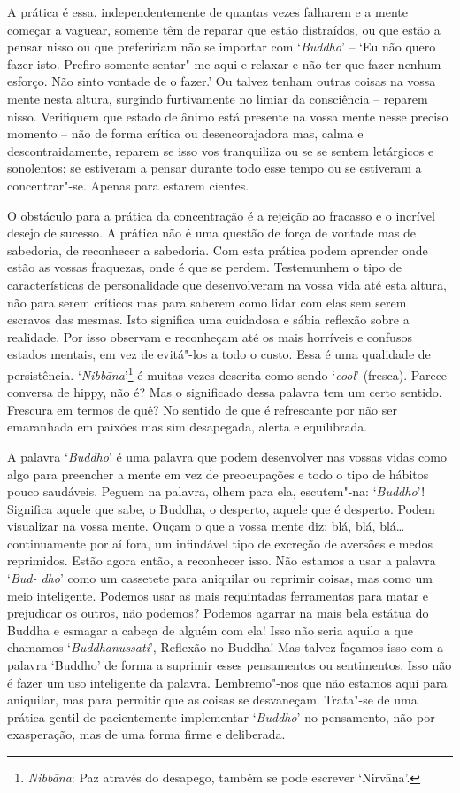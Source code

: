 A prática é essa, independentemente de quantas vezes falharem e a mente
começar a vaguear, somente têm de reparar que estão distraídos, ou que
estão a pensar nisso ou que prefeririam não se importar com
`\emph{Buddho}' -- `Eu não quero fazer isto. Prefiro somente sentar"-me
aqui e relaxar e não ter que fazer nenhum esforço. Não sinto vontade de
o fazer.' Ou talvez tenham outras coisas na vossa mente nesta altura,
surgindo furtivamente no limiar da consciência -- reparem nisso.
Verifiquem que estado de ânimo está presente na vossa mente nesse
preciso momento -- não de forma crítica ou desencorajadora mas, calma e
descontraidamente, reparem se isso vos tranquiliza ou se se sentem
letárgicos e sonolentos; se estiveram a pensar durante todo esse tempo
ou se estiveram a concentrar"-se. Apenas para estarem cientes.

O obstáculo para a prática da concentração é a rejeição ao fracasso e o
incrível desejo de sucesso. A prática não é uma questão de força de
vontade mas de sabedoria, de reconhecer a sabedoria. Com esta prática
podem aprender onde estão as vossas fraquezas, onde é que se perdem.
Testemunhem o tipo de características de personalidade que desenvolveram
na vossa vida até esta altura, não para serem críticos mas para saberem
como lidar com elas sem serem escravos das mesmas. Isto significa
uma cuidadosa e sábia reflexão sobre a realidade. Por isso observam e
reconheçam até os mais horríveis e confusos estados mentais, em vez de
evitá"-los a todo o custo. Essa é uma qualidade de persistência.
`\emph{Nibbāna}'\footnote{%
  \emph{Nibbāna}: Paz através do desapego, também se pode escrever `Nirvāņa'.}
é muitas vezes descrita como sendo `\emph{cool}'
(fresca). Parece conversa de hippy, não é? Mas o significado dessa
palavra tem um certo sentido. Frescura em termos de quê? No sentido de
que é refrescante por não ser emaranhada em paixões mas sim desapegada,
alerta e equilibrada.

A palavra `\emph{Buddho}' é uma palavra que podem desenvolver nas vossas
vidas como algo para preencher a mente em vez de preocupações e todo o
tipo de hábitos pouco saudáveis. Peguem na palavra, olhem para ela,
escutem"-na: `\emph{Buddho}'! Significa aquele que sabe, o Buddha, o
desperto, aquele que é desperto. Podem visualizar na vossa mente. Ouçam
o que a vossa mente diz: blá, blá, blá\ldots{} continuamente por aí
fora, um infindável tipo de excreção de aversões e medos reprimidos.
Estão agora então, a reconhecer isso. Não estamos a usar a palavra
`\emph{Bud- dho}' como um cassetete para aniquilar ou reprimir coisas,
mas como um meio inteligente. Podemos usar as mais requintadas
ferramentas para matar e prejudicar os outros, não podemos? Podemos
agarrar na mais bela estátua do Buddha e esmagar a cabeça de alguém com
ela! Isso não seria aquilo a que chamamos
`\emph{Buddhanussati}', Reflexão no Buddha! Mas talvez façamos isso com
a palavra `Buddho' de forma a suprimir esses pensamentos ou sentimentos.
Isso não é fazer um uso inteligente da palavra. Lembremo"-nos que não
estamos aqui para aniquilar, mas para permitir que as coisas se
desvaneçam. Trata"-se de uma prática gentil de pacientemente implementar
`\emph{Buddho}' no pensamento, não por exasperação, mas de uma
forma firme e deliberada.

